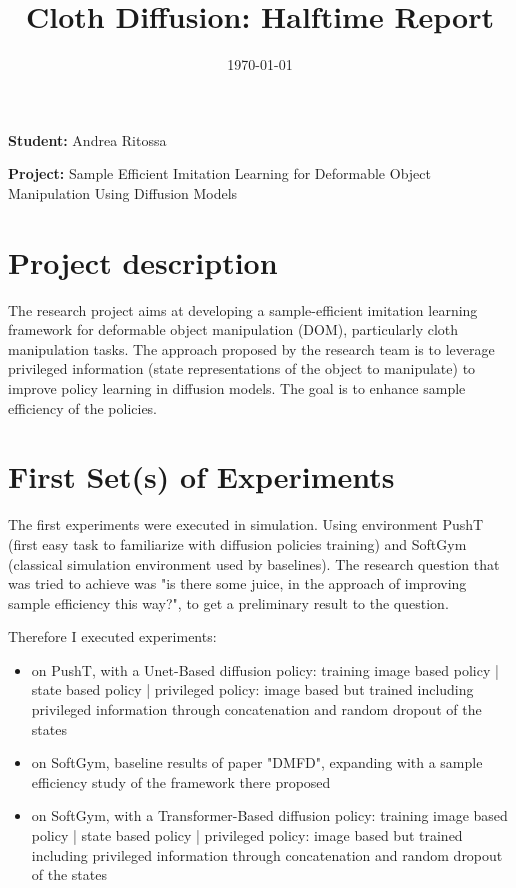 \documentclass{article}
\title{Cloth Diffusion: Halftime Report}
\author{}
\date{\today}
\begin{document}
\maketitle

\textbf{Student:} Andrea Ritossa

\textbf{Project:} Sample Efficient Imitation Learning for Deformable Object Manipulation Using Diffusion Models

\section*{Project description}

The research project aims at developing a sample-efficient imitation learning framework for deformable object manipulation (DOM), particularly cloth manipulation tasks. The approach proposed by the research team is to leverage privileged information (state representations of the object to manipulate) to improve policy learning in diffusion models. The goal is to enhance sample efficiency of the policies.

\section{First Set(s) of Experiments}

The first experiments were executed in simulation. Using environment PushT (first easy task to familiarize with diffusion policies training) and SoftGym (classical simulation environment used by baselines).
The research question that was tried to achieve was "is there some juice, in the approach of improving sample efficiency this way?", to get a preliminary result to the question.

Therefore I executed experiments:
\begin{itemize}
    \item on PushT, with a Unet-Based diffusion policy: training image based policy | state based policy | privileged policy: image based but trained including privileged information through concatenation and random dropout of the states
    \item on SoftGym, baseline results of paper "DMFD", expanding with a sample efficiency study of the framework there proposed
    \item on SoftGym, with a Transformer-Based diffusion policy: training image based policy | state based policy | privileged policy: image based but trained including privileged information through concatenation and random dropout of the states
\end{itemize}
\end{document}
